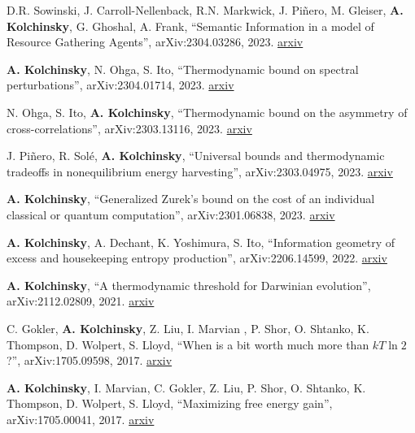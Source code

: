 
D.R. Sowinski, J. Carroll-Nellenback, R.N. Markwick, J. Piñero, M. Gleiser, \textbf{A. Kolchinsky}, G. Ghoshal, A. Frank,
``Semantic Information in a model of Resource Gathering Agents'', arXiv:2304.03286, 2023. \href{http://arxiv.org/abs/2304.03286}{arxiv}


\textbf{A. Kolchinsky}, N. Ohga, S. Ito, ``Thermodynamic bound on spectral perturbations'', arXiv:2304.01714, 2023. \href{http://arxiv.org/abs/2304.01714}{arxiv}


N. Ohga, S. Ito, \textbf{A. Kolchinsky}, ``Thermodynamic bound on the asymmetry of cross-correlations'', arXiv:2303.13116, 2023. \href{http://arxiv.org/abs/2303.13116}{arxiv}

J. Piñero, R. Solé, \textbf{A. Kolchinsky}, ``Universal bounds and thermodynamic tradeoffs in nonequilibrium energy harvesting'', arXiv:2303.04975, 2023. \href{http://arxiv.org/abs/2303.04975}{arxiv}

\textbf{A. Kolchinsky}, ``Generalized Zurek's bound on the cost of an individual classical or quantum computation'', arXiv:2301.06838, 2023. \href{http://arxiv.org/abs/2301.06838}{arxiv}

\textbf{A. Kolchinsky}, A. Dechant, K. Yoshimura, S. Ito, 
``Information geometry of excess and housekeeping entropy production'', arXiv:2206.14599, 2022. \href{https://arxiv.org/abs/2206.14599}{arxiv}

\textbf{A. Kolchinsky}, ``A thermodynamic threshold for Darwinian evolution'', arXiv:2112.02809, 2021. \href{http://arxiv.org/abs/2112.02809}{arxiv} 

C. Gokler, \textbf{A. Kolchinsky}, Z. Liu, I. Marvian , P. Shor, O. Shtanko, K. Thompson, D. Wolpert, S. Lloyd, ``When is a bit worth much more than $kT \ln 2$?'', arXiv:1705.09598, 2017. \href{https://arxiv.org/abs/1705.09598}{arxiv}

\textbf{A. Kolchinsky}, I. Marvian, C. Gokler, Z. Liu, P. Shor, O. Shtanko, K. Thompson, D. Wolpert, S. Lloyd, ``Maximizing free energy gain'', arXiv:1705.00041, 2017. \href{https://arxiv.org/abs/1705.00041}{arxiv}

